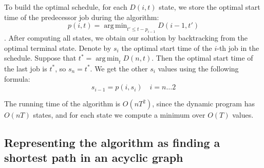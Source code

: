 \documentclass{article}
\DeclareMathOperator*{\argmin}{arg\,min}
\begin{document}
To build the optimal schedule, for each $D(i,t)$ state, we store the optimal start time of the predecessor job during the algorithm: 
$$p(i,t) = \argmin_{t' \leq t-p_{i-1}} D(i-1,t')$$
.
After computing all states, we obtain our solution by backtracking from the optimal terminal state. Denote by $s_i$ the optimal start time of the $i$-th job in the schedule. Suppose that $t^* = \argmin_{t} D(n,t)$. Then the optimal start time of the last job is $t^*$, so $s_n = t^*$. We get the other $s_i$ values using the following formula:
$$s_{i-1} = p(i,s_{i}) \quad i = n \dots 2$$


The running time of the algorithm is $O(nT^2)$, since the dynamic program has $O(nT)$ states, and for each state we compute a minimum over $O(T)$ values.



\subsection{Representing the algorithm as finding a shortest path in an acyclic graph}
\end{document}
